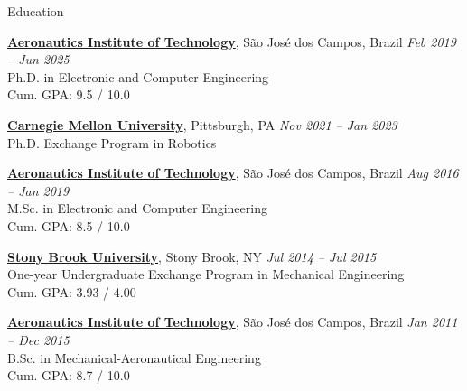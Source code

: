 \documentclass{resume} %
\begin{document}
\small


\begin{rSection}{Education}

{\bf \href{http://www.ita.br/}{Aeronautics Institute of Technology}}, São José dos Campos, Brazil
\hfill {\em Feb 2019 -- Jun 2025} \\
Ph.D. in Electronic and Computer Engineering \\
Cum. GPA: 9.5 / 10.0

{\bf \href{https://www.cmu.edu/}{Carnegie Mellon University}}, Pittsburgh, PA
\hfill {\em Nov 2021 -- Jan 2023} \\
Ph.D. Exchange Program in Robotics

{\bf \href{http://www.ita.br/}{Aeronautics Institute of Technology}}, São José dos Campos, Brazil
\hfill {\em Aug 2016 -- Jan 2019} \\
M.Sc. in Electronic and Computer Engineering \\
Cum. GPA: 8.5 / 10.0

{\bf \href{https://www.stonybrook.edu/}{Stony Brook University}}, Stony Brook, NY
\hfill {\em Jul 2014 -- Jul 2015} \\
One-year Undergraduate Exchange Program in Mechanical Engineering\\
Cum. GPA: 3.93 / 4.00

{\bf \href{http://www.ita.br/}{Aeronautics Institute of Technology}}, São José dos Campos, Brazil
\hfill {\em Jan 2011 -- Dec 2015} \\
B.Sc. in Mechanical-Aeronautical Engineering\\
Cum. GPA: 8.7 / 10.0
\end{rSection}

\end{document}
